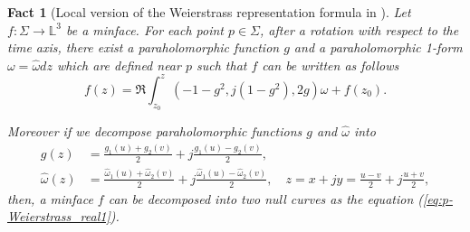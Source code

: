 \documentclass[11pt,reqno]{amsart}
\theoremstyle{plain} %
\newtheorem{fact}[theorem]{Fact}
\theoremstyle{definition}
\begin{document}
\begin{fact}[Local version of the Weierstrass representation formula in {\cite{T}}]\label{theorem:p-Weierstrass}
Let $f : \Sigma \rightarrow \mathbb{L}^3$ be a minface.  For each point $p \in \Sigma$, after a rotation with respect to the time axis, there exist a paraholomorphic function $g$ and a paraholomorphic 1-form $\omega=\hat{\omega}dz$ which are defined near $p$ such that $f$ can be written as follows
\begin{equation}\label{eq:p-Weierstrass}
  f(z)
  =\Re \int^z_{z_0}\left( -1-g^2, j(1-g^2), 2g \right)\omega
    +f(z_0).
\end{equation}

Moreover if we decompose paraholomorphic functions $g$ and $\hat{\omega}$ into 
\begin{align}
g(z)&=\frac{g_1(u)+g_2(v)}{2}+j\frac{g_1(u)-g_2(v)}{2},\label{decomp1}\\ 
\hat{\omega}(z)&=\frac{\hat{\omega}_1(u)+\hat{\omega}_2(v)}{2}+j\frac{\hat{\omega}_1(u)-\hat{\omega}_2(v)}{2},\quad z=x+jy=\frac{u-v}{2}+j\frac{u+v}{2}, \label{decomp2}
\end{align}
then, a minface $f$ can be decomposed into two null curves as the equation (\ref{eq:p-Weierstrass_real1}).
\end{fact}
\end{document}
